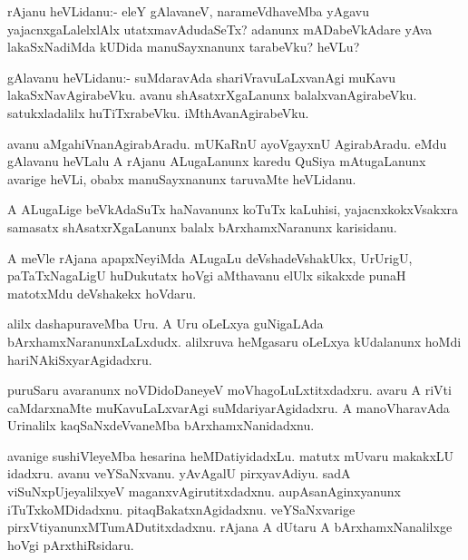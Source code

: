 \begin{mng}
rAjanu heVLidanu:- eleY gAlavaneV, narameVdhaveMba yAgavu yajacnxgaLalelxlAlx utatxmavAdudaSeTx? adanunx mADabeVkAdare yAva lakaSxNadiMda kUDida manuSayxnanunx tarabeVku? heVLu?
\end{mng}

\begin{mng}
gAlavanu heVLidanu:- suMdaravAda shariVravuLaLxvanAgi muKavu lakaSxNavAgirabeVku. avanu shAsatxrXgaLanunx balalxvanAgirabeVku. satukxladalilx huTiTxrabeVku. iMthAvanAgirabeVku.
\end{mng}

\begin{mng}
avanu aMgahiVnanAgirabAradu. mUKaRnU ayoVgayxnU AgirabAradu. eMdu gAlavanu heVLalu A rAjanu ALugaLanunx karedu QuSiya mAtugaLanunx avarige heVLi, obabx manuSayxnanunx taruvaMte heVLidanu.
\end{mng}

\begin{mng}
A ALugaLige beVkAdaSuTx haNavanunx koTuTx kaLuhisi, yajacnxkokxVsakxra samasatx shAsatxrXgaLanunx balalx bArxhamxNaranunx karisidanu.
\end{mng}

\begin{mng}
A meVle rAjana apapxNeyiMda ALugaLu deVshadeVshakUkx, UrUrigU, paTaTxNagaLigU huDukutatx hoVgi aMthavanu elUlx sikakxde punaH matotxMdu deVshakekx hoVdaru.
\end{mng}

\begin{mng}
alilx dashapuraveMba Uru. A Uru oLeLxya guNigaLAda bArxhamxNaranunxLaLxdudx. alilxruva heMgasaru oLeLxya kUdalanunx hoMdi hariNAkiSxyarAgidadxru.
\end{mng}

\begin{mng}
puruSaru avaranunx noVDidoDaneyeV moVhagoLuLxtitxdadxru. avaru A riVti caMdarxnaMte muKavuLaLxvarAgi suMdariyarAgidadxru. A manoVharavAda Urinalilx kaqSaNxdeVvaneMba bArxhamxNanidadxnu.
\end{mng}

\begin{mng}
avanige sushiVleyeMba hesarina heMDatiyidadxLu. matutx mUvaru makakxLU idadxru. avanu veYSaNxvanu. yAvAgalU pirxyavAdiyu. sadA viSuNxpUjeyalilxyeV maganxvAgirutitxdadxnu. aupAsanAginxyanunx iTuTxkoMDidadxnu. pitaqBakatxnAgidadxnu. veYSaNxvarige pirxVtiyanunxMTumADutitxdadxnu. rAjana A dUtaru A bArxhamxNanalilxge hoVgi pArxthiRsidaru.
\end{mng}


